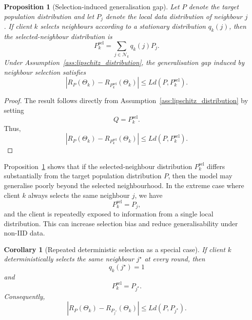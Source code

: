 \documentclass[conference]{IEEEtran}
\newtheorem{proposition}{Proposition}
\newtheorem{corollary}{Corollary}
\begin{document}
\begin{proposition}[Selection-induced generalisation gap]
\label{prop:selection_gap}
Let $P$ denote the target population distribution and let $P_j$ denote the local data distribution of neighbour $j$. If client $k$ selects neighbours according to a stationary distribution $q_k(j)$, then the selected-neighbour distribution is
\begin{equation}
P_k^{\mathrm{sel}}
=
\sum_{j\in\mathcal{N}_k}
q_k(j)P_j.
    \label{eq:auto-051}
\end{equation}
Under Assumption~\ref{ass:lipschitz_distribution}, the generalisation gap induced by neighbour selection satisfies
\begin{equation}
\left|
R_P(\Theta_k)
-
R_{P_k^{\mathrm{sel}}}(\Theta_k)
\right|
\leq
L d(P,P_k^{\mathrm{sel}}).
    \label{eq:auto-052}
\end{equation}
\end{proposition}

\begin{proof}
The result follows directly from Assumption~\ref{ass:lipschitz_distribution} by setting
\begin{equation}
Q=P_k^{\mathrm{sel}}.
    \label{eq:auto-053}
\end{equation}
Thus,
\begin{equation}
\left|
R_P(\Theta_k)
-
R_{P_k^{\mathrm{sel}}}(\Theta_k)
\right|
\leq
L d(P,P_k^{\mathrm{sel}}).
    \label{eq:auto-054}
\end{equation}
\end{proof}

Proposition~\ref{prop:selection_gap} shows that if the selected-neighbour distribution $P_k^{\mathrm{sel}}$ differs substantially from the target population distribution $P$, then the model may generalise poorly beyond the selected neighbourhood. In the extreme case where client $k$ always selects the same neighbour $j$, we have
\begin{equation}
P_k^{\mathrm{sel}}=P_j,
    \label{eq:auto-055}
\end{equation}
and the client is repeatedly exposed to information from a single local distribution. This can increase selection bias and reduce generalisability under non-IID data.

\begin{corollary}[Repeated deterministic selection as a special case]
\label{cor:deterministic_selection}
If client $k$ deterministically selects the same neighbour $j^\star$ at every round, then
\begin{equation}
q_k(j^\star)=1
    \label{eq:auto-056}
\end{equation}
and
\begin{equation}
P_k^{\mathrm{sel}}=P_{j^\star}.
    \label{eq:auto-057}
\end{equation}
Consequently,
\begin{equation}
\left|
R_P(\Theta_k)
-
R_{P_{j^\star}}(\Theta_k)
\right|
\leq
L d(P,P_{j^\star}).
    \label{eq:auto-058}
\end{equation}
\end{corollary}
\end{document}
